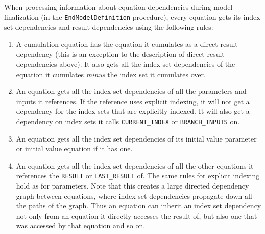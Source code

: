 \documentclass[11pt]{article}
\theoremstyle{definition}
\begin{document}
When processing information about equation dependencies during model finalization (in the {\tt EndModelDefinition} procedure), every equation gets its index set dependencies and result dependencies using the following rules:
\begin{enumerate}[i]
\item A cumulation equation has the equation it cumulates as a direct result dependency (this is an exception to the description of direct result dependencies above). It also gets all the index set dependencies of the equation it cumulates \emph{minus} the index set it cumulates over.
\item An equation gets all the index set dependencies of all the parameters and inputs it references. If the reference uses explicit indexing, it will not get a dependency for the index sets that are explicitly indexed. It will also get a dependency on index sets it calls {\tt CURRENT\_INDEX} or {\tt BRANCH\_INPUTS} on.
\item An equation gets all the index set dependencies of its initial value parameter or initial value equation if it has one.
\item An equation gets all the index set dependencies of all the other equations it references the {\tt RESULT} or {\tt LAST\_RESULT} of. The same rules for explicit indexing hold as for parameters. Note that this creates a large directed dependency graph between equations, where index set dependencies propagate down all the paths of the graph. Thus an equation can inherit an index set dependency not only from an equation it directly accesses the result of, but also one that was accessed by that equation and so on.
\end{enumerate}
\end{document}
